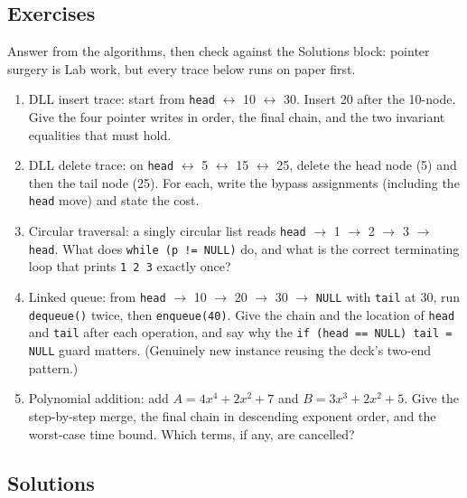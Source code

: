 \documentclass[11pt]{article}
\begin{document}
\subsection*{Exercises}

Answer from the algorithms, then check against the Solutions block: pointer surgery is Lab work, but every trace below runs on paper first.
\begin{enumerate}
  \item DLL insert trace: start from \texttt{head} $\leftrightarrow$ 10 $\leftrightarrow$ 30. Insert 20 after the 10-node. Give the four pointer writes in order, the final chain, and the two invariant equalities that must hold.
  \item DLL delete trace: on \texttt{head} $\leftrightarrow$ 5 $\leftrightarrow$ 15 $\leftrightarrow$ 25, delete the head node (5) and then the tail node (25). For each, write the bypass assignments (including the \texttt{head} move) and state the cost.
  \item Circular traversal: a singly circular list reads \texttt{head} $\to$ 1 $\to$ 2 $\to$ 3 $\to$ \texttt{head}. What does \texttt{while (p != NULL)} do, and what is the correct terminating loop that prints \texttt{1 2 3} exactly once?
  \item Linked queue: from \texttt{head} $\to$ 10 $\to$ 20 $\to$ 30 $\to$ \texttt{NULL} with \texttt{tail} at 30, run \texttt{dequeue()} twice, then \texttt{enqueue(40)}. Give the chain and the location of \texttt{head} and \texttt{tail} after each operation, and say why the \texttt{if (head == NULL) tail = NULL} guard matters. (Genuinely new instance reusing the deck's two-end pattern.)
  \item Polynomial addition: add $A = 4x^{4} + 2x^{2} + 7$ and $B = 3x^{3} + 2x^{2} + 5$. Give the step-by-step merge, the final chain in descending exponent order, and the worst-case time bound. Which terms, if any, are cancelled?
\end{enumerate}

\subsection*{Solutions}
\end{document}
